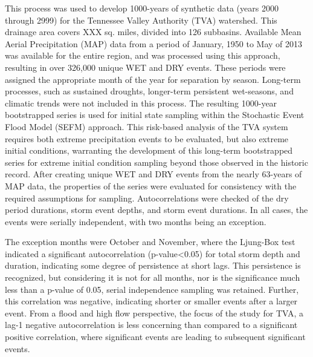 \documentclass[11pt]{article} %
\begin{document}
This process was used to develop 1000-years of synthetic data (years 2000 through 2999) for the Tennessee Valley Authority (TVA) watershed. This drainage area covers XXX sq. miles, divided into 126 subbasins. Available Mean Aerial Precipitation (MAP) data from a period of January, 1950 to May of 2013 was available for the entire region, and was processed using this approach, resulting in over 326,000 unique WET and DRY events. These periods were assigned the appropriate month of the year for separation by season. Long-term processes, such as sustained droughts, longer-term persistent wet-seasons, and climatic trends were not included in this process.
The resulting 1000-year bootstrapped series is used for initial state sampling within the Stochastic Event Flood Model (SEFM) approach. This risk-based analysis of the TVA system requires both extreme precipitation events to be evaluated, but also extreme initial conditions, warranting the development of this long-term bootstrapped series for extreme initial condition sampling beyond those observed in the historic record. 
After creating unique WET and DRY events from the nearly 63-years of MAP data, the properties of the series were evaluated for consistency with the required assumptions for sampling. Autocorrelations were checked of the dry period durations, storm event depths, and storm event durations. In all cases, the events were serially independent, with two months being an exception. 

The exception months were October and November, where the Ljung-Box test indicated a significant autocorrelation (p-value<0.05) for total storm depth and duration, indicating some degree of persistence at short lags. This persistence is recognized, but considering it is not for all months, nor is the significance much less than a p-value of 0.05, serial independence sampling was retained. Further, this correlation was negative, indicating shorter or smaller events after a larger event. From a flood and high flow perspective, the focus of the study for TVA, a lag-1 negative autocorrelation is less concerning than compared to a significant positive correlation, where significant events are leading to subsequent significant events.
\end{document}
